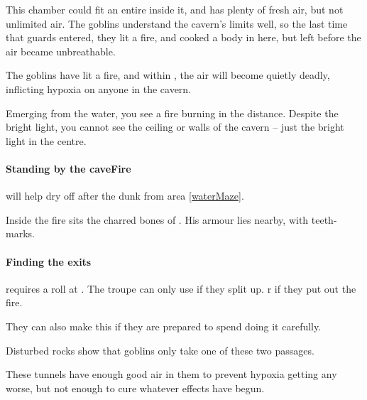 \begin{multicols}{2}


\begin{exampletext}
  This chamber could fit an entire  inside it, and has plenty of fresh air, but not unlimited air.
  The goblins understand the cavern's limits well, so the last time that \glspl{guard} entered, they lit a fire, and cooked a body in here, but left before the air became unbreathable.
\end{exampletext}

The goblins have lit a fire, and within , the air will become quietly deadly, inflicting \gls{hypoxia} on anyone in the cavern.

\begin{boxtext}
  Emerging from the water, you see a fire burning in the distance.
  Despite the bright light, you cannot see the ceiling or walls of the cavern -- just the bright light in the centre.
\end{boxtext}

\paragraph{Standing by the \gls{caveFire}}
will help dry off after the dunk from area \ref{waterMaze}.

Inside the fire sits the charred bones of .
His armour lies nearby, with teeth-marks.

\paragraph{Finding the exits}
requires a  roll at \tn[9].
The troupe can only use  if they split up.
r \tn[14] if they put out the fire.

They can also make this  if they are prepared to spend  doing it carefully.


Disturbed rocks show that goblins only take one of these two passages.

These tunnels have enough good air in them to prevent \gls{hypoxia} getting any worse, but not enough to cure whatever effects have begun.


\end{multicols}
